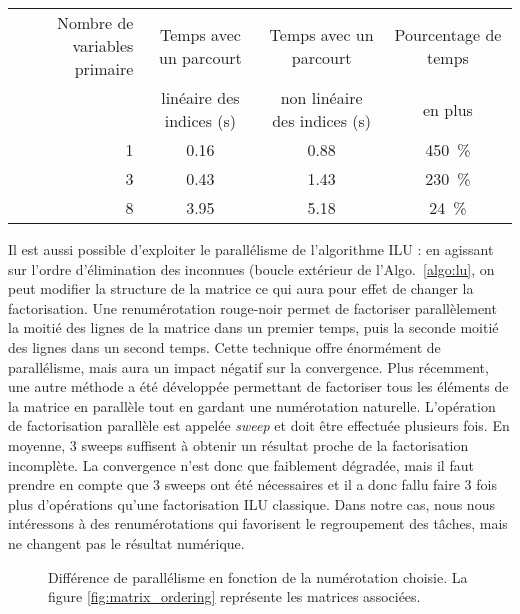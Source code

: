 \begin{center}
  \begin{tabular}{|r|c|c|c|}
    \hline
    Nombre de variables primaire & Temps avec un parcourt & Temps avec un parcourt & Pourcentage de temps\\
    & linéaire des indices (s) & non linéaire des indices (s) & en plus \\
    \hline
    1 & 0.16 & 0.88 & 450~\% \\
    \hline
    3 & 0.43 & 1.43 & 230~\% \\
    \hline
    8 & 3.95 & 5.18 & 24~\% \\
    \hline
  \end{tabular}
  \label{tab:facto_order}
\end{center}


Il est aussi possible d'exploiter le parallélisme de l'algorithme ILU :
%
en agissant sur l'ordre d'élimination des inconnues (boucle extérieur de l'Algo.~\ref{algo:lu}, on peut modifier la structure de la matrice ce qui aura pour effet de changer la factorisation.
%
Une renumérotation rouge-noir permet de factoriser parallèlement la moitié des lignes de la matrice dans un premier temps, puis la seconde moitié des lignes dans un second temps.
%
Cette technique offre énormément de parallélisme, mais aura un impact négatif sur la convergence\cite{red_black_ilu}.
%
Plus récemment, une autre méthode a été développée permettant de factoriser tous les éléments de la matrice en parallèle tout en gardant une numérotation naturelle.
%
L'opération de factorisation parallèle est appelée {\em sweep} et doit être effectuée plusieurs fois\cite{chow2014fine}.
%
En moyenne, 3 sweeps suffisent à obtenir un résultat proche de la factorisation incomplète.
%
La convergence n'est donc que faiblement dégradée, mais il faut prendre en compte que 3 sweeps ont été nécessaires et il a donc fallu faire 3 fois plus d'opérations qu'une factorisation ILU classique.
%
Dans notre cas, nous nous intéressons à des renumérotations qui favorisent le regroupement des tâches, mais ne changent pas le résultat numérique.

\begin{figure}[!h]
     \begin{center}
    \end{center}
    \caption{Différence de parallélisme en fonction de la numérotation choisie. La figure \ref{fig:matrix_ordering} représente les matrices associées.}
    \label{fig:DAG_ordering}
\end{figure}
